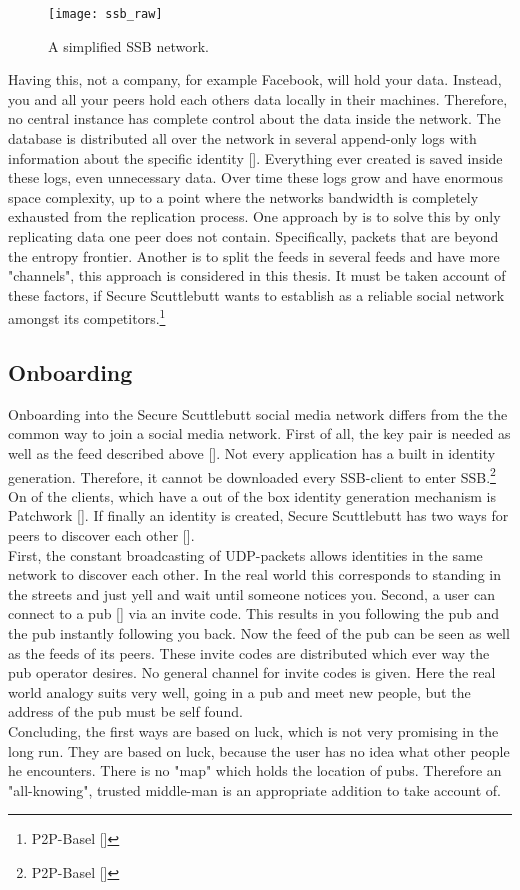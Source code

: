 \begin{figure}
    \centering
    \texttt{[image: ssb\_raw]}
    \caption{A simplified SSB network.}
    \label{fig:sbb-raw}
\end{figure}

Having this, not a company, for example Facebook, will hold your data. Instead, you and all your peers hold each others data locally in their machines. Therefore, no central instance has complete control about the data inside the network. The database is distributed all over the network in several append-only logs with information about the specific identity []. Everything ever created is saved inside these logs, even unnecessary data. Over time these logs grow and have enormous space complexity, up to a point where the networks bandwidth is completely exhausted from the replication process. One approach by \citet{entropy} is to solve this by only replicating data one peer does not contain. Specifically, packets that are beyond the entropy frontier. Another is to split the feeds in several feeds and have more "channels", this approach is considered in this thesis.
It must be taken account of these factors, if Secure Scuttlebutt wants to establish as a reliable social network amongst its competitors.\footnote{P2P-Basel []}

\subsection{Onboarding}
Onboarding into the Secure Scuttlebutt social media network differs from the the common way to join a social media network. First of all, the key pair is needed as well as the feed described above []. Not every application has a built in identity generation. Therefore, it cannot be downloaded every SSB-client to enter SSB.\footnote{P2P-Basel []} On of the clients, which have a out of the box identity generation mechanism is Patchwork []. If finally an identity is created, Secure Scuttlebutt has two ways for peers to discover each other []. \\
First, the constant broadcasting of UDP-packets allows identities in the same network to discover each other. In the real world this corresponds to standing in the streets and just yell and wait until someone notices you. Second, a user can connect to a pub [] via an invite code. This results in you following the pub and the pub instantly following you back. Now the feed of the pub can be seen as well as the feeds of its peers. These invite codes are distributed which ever way the pub operator desires. No general channel for invite codes is given. Here the real world analogy suits very well, going in a pub and meet new people, but the address of the pub must be self found. 
\\
Concluding, the first ways are based on luck, which is not very promising in the long run. They are based on luck, because the user has no idea what other people he encounters. There is no "map" which holds the location of pubs. Therefore an "all-knowing", trusted middle-man is an appropriate addition to take account of.
